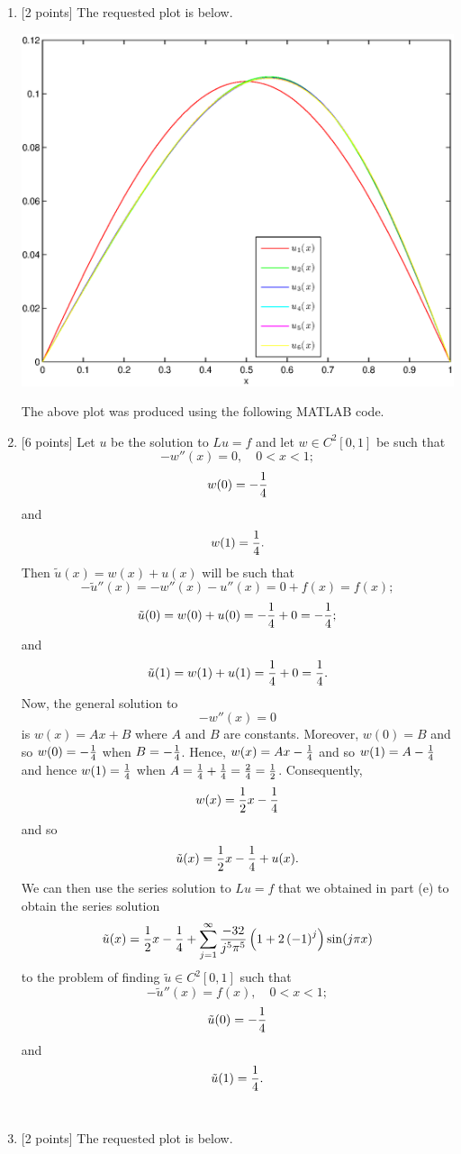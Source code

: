 \begin{solution}
\begin{enumerate}
\item {[2 points]} The requested plot is below.

\begin{center}\includegraphics[scale=0.7]{hw26d.eps}\end{center}

The above plot was produced using the following MATLAB code.



\item {[6 points]} Let $u$ be the solution to $Lu=f$ and let $w\in C^2[0,1]$ be such that
\[
-w''(x)=0,\quad0<x<1;
\]
\[
w(0)=-{1\over4}
\]
and
\[
w(1)={1\over4}.
\]
Then $\tilde{u}(x)=w(x)+u(x)$ will be such that
\[
-\tilde{u}''(x)=-w''(x)-u''(x)=0+f(x)=f(x);
\]
\[
\tilde{u}(0)=w(0)+u(0)=-{1\over4}+0=-{1\over4};
\]
and
\[
\tilde{u}(1)=w(1)+u(1)={1\over4}+0={1\over4}.
\]
Now, the general solution to
\[
-w''(x)=0
\]
is $w(x)=Ax+B$ where $A$ and $B$ are constants. Moreover, $w(0)=B$ and so $w(0)=-{1\over4}$ when $B=-{1\over4}$. Hence, $w(x)=Ax-{1\over4}$ and so $w(1)=A-{1\over4}$ and hence $w(1)={1\over4}$ when $A={1\over4}+{1\over4}={2\over4}={1\over2}$. Consequently,
\[
w(x)={1\over2}x-{1\over4}
\]
and so
\[
\tilde{u}(x)={1\over2}x-{1\over4}+u(x).
\]
We can then use the series solution to $Lu=f$ that we obtained in part (e) to obtain the series solution
\[
\tilde{u}(x)={1\over2}x-{1\over4}+\sum_{j=1}^\infty{-32\over j^5\pi^5}\left(1+2\left(-1\right)^j\right)\sin(j\pi x)
\]
to the problem of finding $\tilde{u}\in C^2[0,1]$ such that
\[
-\tilde{u}''(x)=f(x),\quad0<x<1;
\]
\[
\tilde{u}(0)=-{1\over4}
\]
and
\[
\tilde{u}(1)={1\over4}.
\]
\\
\item {[2 points]} The requested plot is below.


\end{enumerate}
\end{solution}

